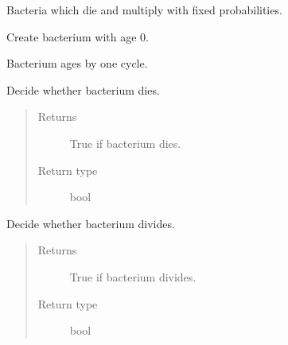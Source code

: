 \documentclass[a4paper,10pt,english]{sphinxmanual}
\begin{document}
\begin{fulllineitems}
\label{\detokenize{dish_and_bacteria:biolab.bacteria.Bacteria}}
Bacteria which die and multiply with fixed probabilities.

Create bacterium with age 0.

\begin{fulllineitems}
\label{\detokenize{dish_and_bacteria:biolab.bacteria.Bacteria.ages}}
Bacterium ages by one cycle.

\end{fulllineitems}


\begin{fulllineitems}
\label{\detokenize{dish_and_bacteria:biolab.bacteria.Bacteria.dies}}
Decide whether bacterium dies.
\begin{quote}\begin{description}
\item[{Returns}] \leavevmode
True if bacterium dies.

\item[{Return type}] \leavevmode
bool

\end{description}\end{quote}

\end{fulllineitems}


\begin{fulllineitems}
\label{\detokenize{dish_and_bacteria:biolab.bacteria.Bacteria.divides}}
Decide whether bacterium divides.
\begin{quote}\begin{description}
\item[{Returns}] \leavevmode
True if bacterium divides.

\item[{Return type}] \leavevmode
bool

\end{description}\end{quote}


\end{fulllineitems}
\end{fulllineitems}
\end{document}
